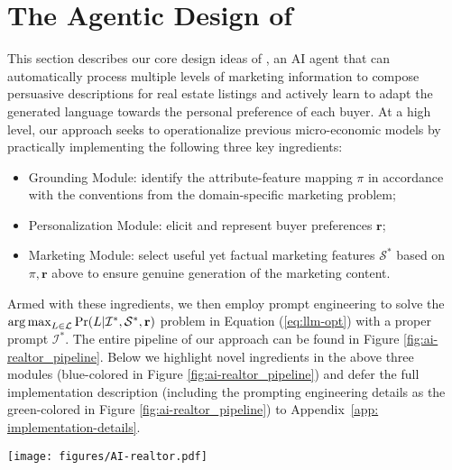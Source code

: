 \section{The Agentic Design of \agentname}
This section describes our core design ideas of \agentname, an AI agent that can automatically process multiple levels of marketing information to compose persuasive descriptions for real estate listings and   actively learn to adapt the generated language towards the personal preference of each buyer. 
At a high level, our approach seeks to operationalize previous micro-economic models by practically implementing the following three key ingredients:
\begin{itemize}  
    \item Grounding Module: identify the attribute-feature mapping $\pi$ in accordance with the conventions from the domain-specific marketing problem;  
    \item Personalization Module: elicit and represent   buyer preferences $\mathbf{r}$;  
    \item Marketing Module: select useful yet factual marketing features $\mathcal{S}^*$ based on $\pi, \mathbf{r}$ above to ensure genuine generation of the marketing content. 
\end{itemize}
Armed with these ingredients, we then employ  prompt engineering to solve the $ \operatorname*{arg\,max}_{L\in \mathcal{L}} \Pr(L| \mathcal{I}^*, \mathcal{S}^*, \mathbf{r})$ problem in Equation (\ref{eq:llm-opt}) with a proper prompt $\mathcal{I}^*$. The entire pipeline of our approach can be found in Figure \ref{fig:ai-realtor_pipeline}.  Below we highlight   novel ingredients in the above three modules (blue-colored in Figure \ref{fig:ai-realtor_pipeline}) and defer the  full implementation description (including the prompting engineering details as the green-colored in Figure \ref{fig:ai-realtor_pipeline}) to Appendix~\ref{app: implementation-details}.

\begin{figure*}[h]
    \centering
    \texttt{[image: figures/AI-realtor.pdf]}
    \caption{Illustration of the Design Pipeline of \agentname.  }
    \label{fig:ai-realtor_pipeline}
\end{figure*} 

